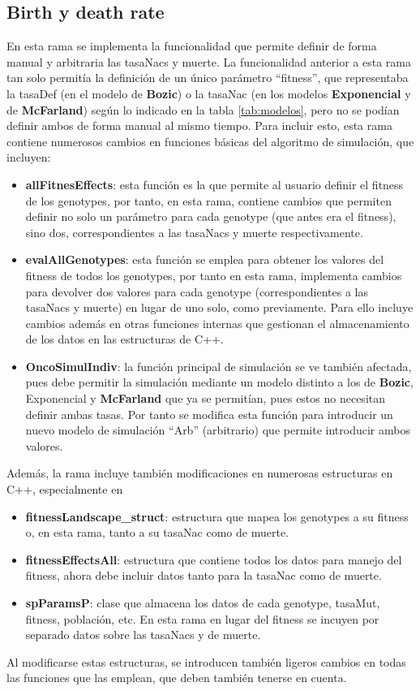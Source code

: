 \subsection{Birth y death rate}\label{2.2.1}
En esta rama\cite{Alberto} se implementa la funcionalidad que permite definir de forma manual y arbitraria las \glspl{tasaNac} y muerte. La funcionalidad anterior a esta rama tan solo permitía la definición de un único parámetro ``\gls{fitness}'', que representaba la \gls{tasaDef} (en el modelo de \textbf{Bozic}) o la \gls{tasaNac} (en los modelos \textbf{Exponencial} y de \textbf{McFarland}) según lo indicado en  la tabla \ref{tab:modelos}, pero no se podían definir ambos de forma manual al mismo tiempo.
Para incluir esto, esta rama contiene numerosos cambios en funciones básicas del algoritmo de simulación, que incluyen:
\begin{itemize}
	\item \textbf{allFitnesEffects}: esta función es la que permite al usuario definir el \gls{fitness} de los \glspl{genotype}, por tanto, en esta rama, contiene cambios que permiten definir no solo un parámetro para cada \gls{genotype} (que antes era el \gls{fitness}), sino dos, correspondientes a las \glspl{tasaNac} y muerte respectivamente.
	\item \textbf{evalAllGenotypes}: esta función se emplea para obtener los valores del \gls{fitness} de todos los \glspl{genotype}, por tanto en esta rama, implementa cambios para devolver dos valores para cada \gls{genotype} (correspondientes a las \glspl{tasaNac} y muerte) en lugar de uno solo, como previamente. Para ello incluye cambios además en otras funciones internas que gestionan el almacenamiento de los datos en las estructuras de C++.
	\item \textbf{OncoSimulIndiv}: la función principal de simulación se ve también afectada, pues debe permitir la simulación mediante un modelo distinto a los de \textbf{Bozic}, Exponencial y \textbf{McFarland} que ya se permitían, pues estos no necesitan definir ambas tasas. Por tanto se modifica esta función para introducir un nuevo modelo de simulación ``Arb'' (arbitrario) que permite introducir ambos valores.
\end{itemize}
Además, la rama incluye también modificaciones en numerosas estructuras en C++, especialmente en
\begin{itemize}
	\item \textbf{fitnessLandscape\_struct}: estructura que mapea los \glspl{genotype} a su \gls{fitness} o, en esta rama, tanto a su \gls{tasaNac} como de muerte.
	\item \textbf{fitnessEffectsAll}: estructura que contiene todos los datos para manejo del \gls{fitness}, ahora debe incluir datos tanto para la \gls{tasaNac} como de muerte.
	\item \textbf{spParamsP}: clase que almacena los datos de cada \gls{genotype}, \gls{tasaMut}, \gls{fitness}, población, etc. En esta rama en lugar del \gls{fitness} se incuyen por separado datos sobre las \glspl{tasaNac} y de muerte.
\end{itemize}
Al modificarse estas estructuras, se introducen también ligeros cambios en todas las funciones que las emplean, que deben también tenerse en cuenta.

